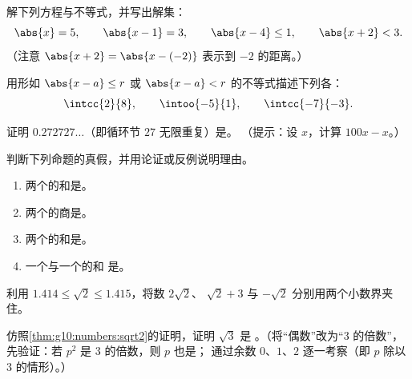 \begin{exercise}[$\star$]\label{exo:g10:numbers:5}
解下列方程与不等式，并写出解集：
\[
\abs{x} = 5, \qquad \abs{x - 1} = 3, \qquad \abs{x - 4} \leq 1, \qquad
\abs{x + 2} < 3 .
\]
（注意 $\abs{x+2} = \abs{x - (-2)}$ 表示到 $-2$ 的距离。）
\end{exercise}

\begin{exercise}[$\star\star$]\label{exo:g10:numbers:6}
用形如
$\abs{x - a} \leq r$ 或 $\abs{x - a} < r$ 的不等式描述下列各：
\[
\intcc{2}{8}, \qquad \intoo{-5}{1}, \qquad \intcc{-7}{-3}.
\]
\end{exercise}

\begin{exercise}[$\star\star$]\label{exo:g10:numbers:7}
证明 $0.272727\dots$（即循环节 $27$ 无限重复）是。
（提示：设 $x$，计算 $100x - x$。）
\end{exercise}

\begin{exercise}[$\star\star$]\label{exo:g10:numbers:8}
判断下列命题的真假，并用论证或反例说明理由。
\begin{enumerate}
  \item 两个的和是。
  \item 两个的商是。
  \item 两个的和是。
  \item 一个与一个的和
        是。
\end{enumerate}
\end{exercise}

\begin{exercise}[$\star\star$]\label{exo:g10:numbers:9}
利用 $1.414 \leq \sqrt 2 \leq 1.415$，将数 $2\sqrt2$、
$\sqrt2 + 3$ 与 $-\sqrt2$ 分别用两个小数界夹住。
\end{exercise}

\begin{exercise}[$\star\star\star$]\label{exo:g10:numbers:10}
仿照\cref{thm:g10:numbers:sqrt2}的证明，证明 $\sqrt 3$ 是
。（将“偶数”改为“$3$ 的倍数”，先验证：若
$p^2$ 是 $3$ 的倍数，则 $p$ 也是；
通过余数 $0$、$1$、$2$ 逐一考察（即 $p$ 除以 $3$ 的情形）。）
\end{exercise}

